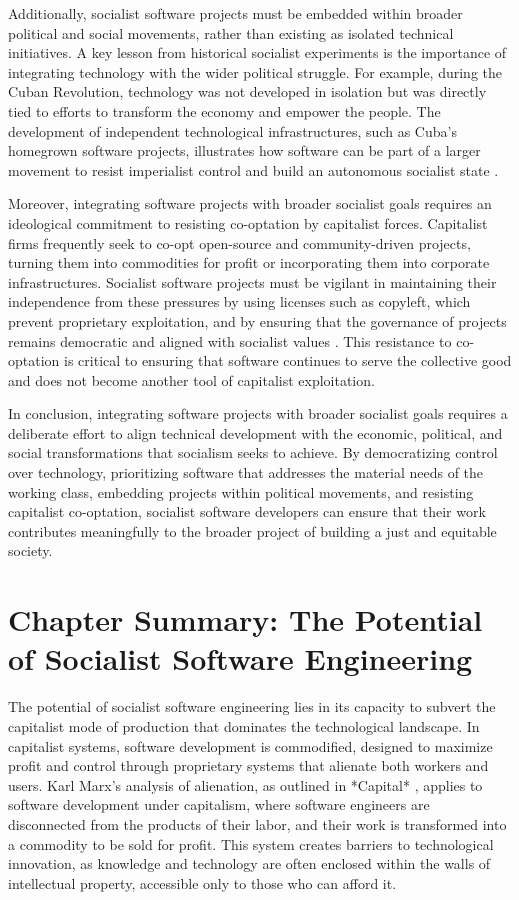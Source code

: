 \begin{refsection}
Additionally, socialist software projects must be embedded within broader political and social movements, rather than existing as isolated technical initiatives. A key lesson from historical socialist experiments is the importance of integrating technology with the wider political struggle. For example, during the Cuban Revolution, technology was not developed in isolation but was directly tied to efforts to transform the economy and empower the people. The development of independent technological infrastructures, such as Cuba’s homegrown software projects, illustrates how software can be part of a larger movement to resist imperialist control and build an autonomous socialist state \cite[pp.~80-83]{nove1991}.

Moreover, integrating software projects with broader socialist goals requires an ideological commitment to resisting co-optation by capitalist forces. Capitalist firms frequently seek to co-opt open-source and community-driven projects, turning them into commodities for profit or incorporating them into corporate infrastructures. Socialist software projects must be vigilant in maintaining their independence from these pressures by using licenses such as copyleft, which prevent proprietary exploitation, and by ensuring that the governance of projects remains democratic and aligned with socialist values \cite[pp.~78-82]{stallman2002}. This resistance to co-optation is critical to ensuring that software continues to serve the collective good and does not become another tool of capitalist exploitation.

In conclusion, integrating software projects with broader socialist goals requires a deliberate effort to align technical development with the economic, political, and social transformations that socialism seeks to achieve. By democratizing control over technology, prioritizing software that addresses the material needs of the working class, embedding projects within political movements, and resisting capitalist co-optation, socialist software developers can ensure that their work contributes meaningfully to the broader project of building a just and equitable society.

\section{Chapter Summary: The Potential of Socialist Software Engineering}

The potential of socialist software engineering lies in its capacity to subvert the capitalist mode of production that dominates the technological landscape. In capitalist systems, software development is commodified, designed to maximize profit and control through proprietary systems that alienate both workers and users. Karl Marx’s analysis of alienation, as outlined in *Capital* \cite[pp.~324]{marx2008}, applies to software development under capitalism, where software engineers are disconnected from the products of their labor, and their work is transformed into a commodity to be sold for profit. This system creates barriers to technological innovation, as knowledge and technology are often enclosed within the walls of intellectual property, accessible only to those who can afford it.


\end{refsection}
